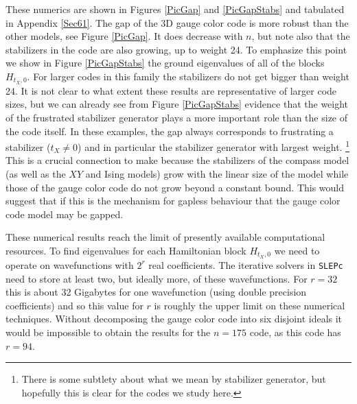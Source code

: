 \documentclass[11pt,oneside]{article}
\begin{document}
These numerics are shown in Figures \ref{PicGap} and
\ref{PicGapStabs} and tabulated in Appendix \ref{Sec61}.
The gap of the 3D gauge color code is more
robust than the other models, see Figure \ref{PicGap}.
It does decrease with $n$, but note also that the
stabilizers in the code are also growing, up to weight 24.
To emphasize this point we show in Figure \ref{PicGapStabs}
the ground eigenvalues of all of the blocks $H_{t_X,0}.$
For larger codes in this family the stabilizers do not get
bigger than weight 24.
It is not clear to what extent these results are
representative of larger code sizes, but we
can already see from Figure \ref{PicGapStabs} 
evidence that 
the weight of the frustrated stabilizer generator plays a more
important role than the size of the code itself.
In these examples, the gap always corresponds to frustrating
a stabilizer ($t_X\ne 0$)
and in particular the stabilizer generator with largest weight.%
\footnote{There is some subtlety about what we mean by 
stabilizer generator, but hopefully this is clear for the
codes we study here.}
This is a crucial connection to make because the
stabilizers of the compass model 
(as well as the $XY$ and Ising models)
grow with the linear
size of the model
while those of the gauge color code 
do not grow beyond a constant bound.
This would suggest that if this is the mechanism for
gapless behaviour that the gauge color code model may
be gapped.

These numerical results reach the limit of presently available 
computational resources.
To find eigenvalues for each Hamiltonian block $H_{t_X,0}$
we need to operate on wavefunctions with $2^r$ real coefficients.
The iterative solvers in {\tt SLEPc} need to store at least two,
but ideally more, of these wavefunctions.
For $r=32$ this is about 32 Gigabytes for one wavefunction (using double
precision coefficients) and so this value for $r$ is roughly the
upper limit on these numerical techniques.
Without decomposing the gauge color code into six disjoint ideals
it would be impossible to obtain the results for the $n=175$ code,
as this code has $r=94$.
\end{document}
